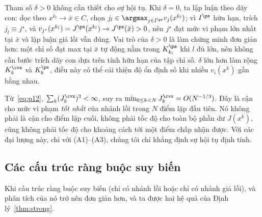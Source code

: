 \begin{remark}\label{rem:delta-role}
Tham số $\delta>0$ không cần thiết cho sự hội tụ. Khi $\delta=0$, ta lập luận theo
dãy con: dọc theo $x^{k_l}\to\bar x\in C$, chọn
$j_l\in\argmax_{j\in I^{\ps}}v_j(x^{k_l})$; vì $I^{\ps}$ hữu hạn, trích
$j_l\equiv j^\star$, và $v_{j^\star}(x^{k_l})=J^{\ps}(x^{k_l})\to J^{\ps}(\bar x)>0$, nên
$j^\star$ đạt mức vi phạm lớn nhất tại $\bar x$ và lập luận giả lồi
vẫn đúng. Vai trò của $\delta>0$ là làm chứng minh đơn giản hơn: một chỉ số đạt max tại $\bar x$ tự động
nằm trong $K^{\ps}_{k_l}$ khi $l$ đủ lớn, nên không cần bước trích dãy con dựa trên tính hữu hạn của tập chỉ số.
$\delta$ lớn hơn làm rộng $K^{\cvx}_k$ và $K^{\ps}_k$, điều này có thể cải thiện độ ổn định
số khi nhiều $v_i(x^k)$ gần bằng nhau.
\end{remark}

\begin{remark}\label{rem:rate}
Từ~\eqref{eq:p12}, $\sum_k(J^{\cvx}_k)^3<\infty$, suy ra
$\min_{0\le k<N}J^{\cvx}_k=O(N^{-1/3})$. Đây là cận cho mức vi phạm \emph{tốt nhất} của nhánh lồi
trong $N$ điểm lặp đầu tiên. Nó không phải là cận cho điểm lặp cuối, không phải tốc độ cho toàn bộ phần dư
$J(x^k)$, cũng không phải tốc độ cho khoảng cách tới một điểm chấp nhận được. Với các đại lượng này,
chỉ với (A1)--(A3), chúng tôi chỉ khẳng định sự hội tụ định tính.
\end{remark}

\subsection{Các cấu trúc ràng buộc suy biến}\label{ssec:degenerate}
Khi cấu trúc ràng buộc suy biến (chỉ có nhánh lồi hoặc chỉ có nhánh giả lồi),
\dtap{} và phân tích của nó trở nên đơn giản hơn, và ta được hai hệ quả của
Định lý~\ref{thm:strong}.

